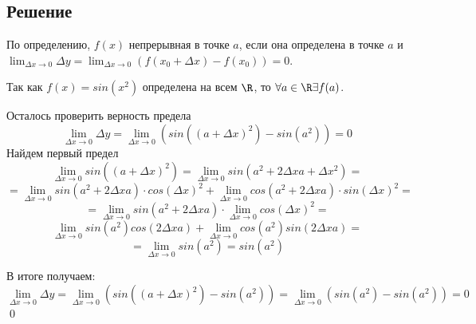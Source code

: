 \subsection*{Решение}
По определению, $f(x)$ непрерывная в точке $a$, если она определена в точке $a$ и $\lim_{\Delta x \rightarrow 0} \Delta y = \lim_{\Delta x \rightarrow 0} \left(f(x_0 + \Delta x) - f(x_0) \right) = 0$.

Так как $f(x) = sin(x^2)$ определена на всем $\R$, то $\forall a \in \R \exists f(a)$.

Осталось проверить верность предела
\[
\lim_{\Delta x \rightarrow 0} \Delta y = \lim_{\Delta x \rightarrow 0}( sin((a + \Delta x)^2) - sin(a^2)) = 0
\]
Найдем первый предел
\[
\lim_{\Delta x \rightarrow 0} sin((a + \Delta x)^2)
=
\lim_{\Delta x \rightarrow 0} sin(a^2 + 2\Delta xa + \Delta x^2) =
\]
\[
=
\lim_{\Delta x \rightarrow 0} sin(a^2 + 2\Delta xa) \cdot cos(\Delta x)^2
+
\lim_{\Delta x \rightarrow 0} cos(a^2 + 2\Delta xa) \cdot sin(\Delta x)^2
=\]
\[
=
\lim_{\Delta x \rightarrow 0} sin(a^2 + 2\Delta xa) \cdot \lim_{\Delta x \rightarrow 0} cos(\Delta x)^2
=
\]
\[
\lim_{\Delta x \rightarrow 0} sin(a^2)cos(2\Delta xa)
+
\lim_{\Delta x \rightarrow 0} cos(a^2)sin(2\Delta xa)
=
\]
\[
=
\lim_{\Delta x \rightarrow 0} sin(a^2) = sin(a^2)
\]

В итоге получаем:
\[
\lim_{\Delta x \rightarrow 0} \Delta y = \lim_{\Delta x \rightarrow 0}( sin((a + \Delta x)^2) - sin(a^2)) = \lim_{\Delta x \rightarrow 0}( sin(a^2) - sin(a^2)) = 0
\]
\qed